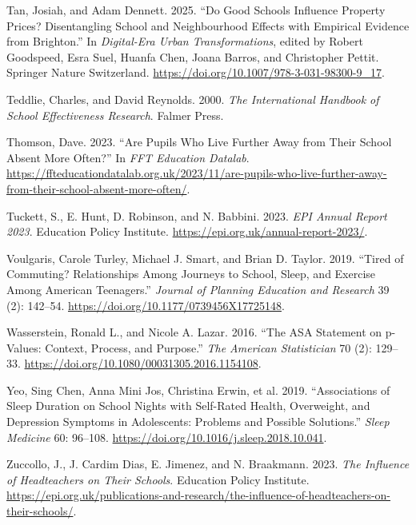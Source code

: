 \documentclass[
  12pt,
  titlepage]{article}
\newlength{\cslhangindent}
\newenvironment{CSLReferences}[2] %
 {\begin{list}{}{%
  \setlength{\itemindent}{0pt}
  \setlength{\leftmargin}{0pt}
  \setlength{\parsep}{0pt}
  \ifodd #1
   \setlength{\leftmargin}{\cslhangindent}
   \setlength{\itemindent}{-1\cslhangindent}
  \fi
  \setlength{\itemsep}{#2\baselineskip}}}
 {\end{list}}
\begin{document}
\begin{CSLReferences}{1}{1}
Tan, Josiah, and Adam Dennett. 2025. {``Do {Good} {Schools} {Influence}
{Property} {Prices}? {Disentangling} {School} and {Neighbourhood}
{Effects} with {Empirical} {Evidence} from {Brighton}.''} In
\emph{Digital-{Era} {Urban} {Transformations}}, edited by Robert
Goodspeed, Esra Suel, Huanfa Chen, Joana Barros, and Christopher Pettit.
Springer Nature Switzerland.
\url{https://doi.org/10.1007/978-3-031-98300-9_17}.

Teddlie, Charles, and David Reynolds. 2000. \emph{The {International}
{Handbook} of {School} {Effectiveness} {Research}}. Falmer Press.

Thomson, Dave. 2023. {``Are Pupils Who Live Further Away from Their
School Absent More Often?''} In \emph{FFT Education Datalab}.
\url{https://ffteducationdatalab.org.uk/2023/11/are-pupils-who-live-further-away-from-their-school-absent-more-often/}.

Tuckett, S., E. Hunt, D. Robinson, and N. Babbini. 2023. \emph{{EPI}
{Annual} {Report} 2023}. Education Policy Institute.
\url{https://epi.org.uk/annual-report-2023/}.

Voulgaris, Carole Turley, Michael J. Smart, and Brian D. Taylor. 2019.
{``Tired of Commuting? {Relationships} Among Journeys to School, Sleep,
and Exercise Among {American} Teenagers.''} \emph{Journal of Planning
Education and Research} 39 (2): 142--54.
\url{https://doi.org/10.1177/0739456X17725148}.

Wasserstein, Ronald L., and Nicole A. Lazar. 2016. {``The {ASA}
Statement on p-Values: Context, Process, and Purpose.''} \emph{The
American Statistician} 70 (2): 129--33.
\url{https://doi.org/10.1080/00031305.2016.1154108}.

Yeo, Sing Chen, Anna Mini Jos, Christina Erwin, et al. 2019.
{``Associations of Sleep Duration on School Nights with Self-Rated
Health, Overweight, and Depression Symptoms in Adolescents: Problems and
Possible Solutions.''} \emph{Sleep Medicine} 60: 96--108.
\url{https://doi.org/10.1016/j.sleep.2018.10.041}.

Zuccollo, J., J. Cardim Dias, E. Jimenez, and N. Braakmann. 2023.
\emph{The Influence of Headteachers on Their Schools}. Education Policy
Institute.
\url{https://epi.org.uk/publications-and-research/the-influence-of-headteachers-on-their-schools/}.

\end{CSLReferences}
\end{document}
